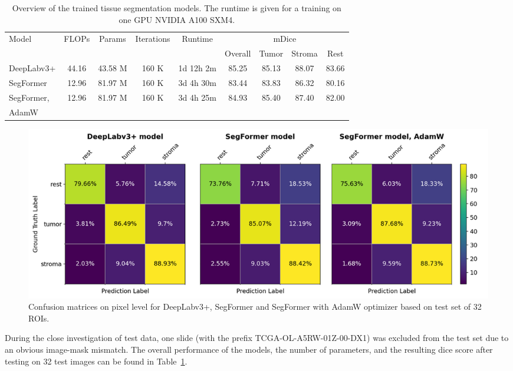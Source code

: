 \begin{table}[h!]
    \centering
    \begin{tabular}{ l c c c c c c c c}
        \hline
        \multirow{2}{*}{Model} & \multirow{2}{*}{FLOPs} & \multirow{2}{*}{Params} & \multirow{2}{*}{Iterations} & \multirow{2}{*}{Runtime} & \multicolumn{4}{c}{mDice}\\
        & & & & & Overall & Tumor & Stroma & Rest \\
        \hline
        DeepLabv3+ & 44.16 & 43.58 M & 160 K & 1d 12h 2m & 85.25 & 85.13 & 88.07 & 83.66\\
        SegFormer & 12.96 & 81.97 M & 160 K  & 3d 4h 30m & 83.44 & 83.83 & 86.32 & 80.16\\
        SegFormer, & \multirow{2}{*}{12.96} & \multirow{2}{*}{81.97 M} & \multirow{2}{*}{160 K} & \multirow{2}{*}{3d 4h 25m} & \multirow{2}{*}{84.93} & \multirow{2}{*}{85.40} & \multirow{2}{*}{87.40} & \multirow{2}{*}{82.00}\\
        AdamW & & & & & & & & \\
        \hline
    \end{tabular}
\caption{\label{tab:tissue_perform} Overview of the trained tissue segmentation models. The runtime is given for a training on one GPU NVIDIA A100 SXM4.}
\end{table}

\begin{figure}[H]
    \includegraphics[width=\linewidth]{figures/tissue/conf_matrices.png}
    \caption{Confusion matrices on pixel level for DeepLabv3+, SegFormer and SegFormer with AdamW optimizer
    based on test set of 32 ROIs.}
    \label{fig:tissue_confusion}
\end{figure}

During the close investigation of test data, one slide (with the prefix TCGA-OL-A5RW-01Z-00-DX1)
was excluded from the test set due to an obvious image-mask mismatch. The overall
performance of the models, the number of parameters, and the resulting dice score after testing on 
32 test images can be found in Table~\ref*{tab:tissue_perform}.

